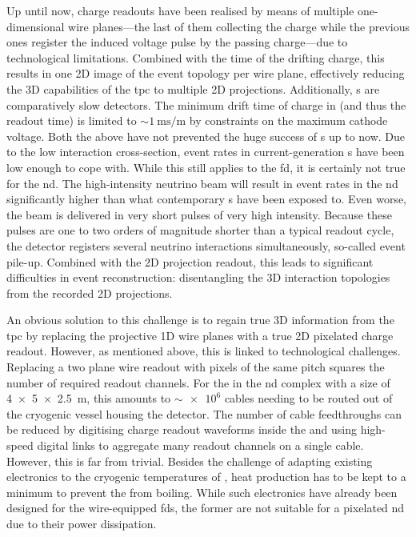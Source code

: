 Up until now, \lartpc{} charge readouts have been realised by means of multiple one-dimensional wire planes---the last of them collecting the charge while the previous ones register the induced voltage pulse by the passing charge---due to technological limitations.
Combined with the time of the drifting charge, this results in one 2D image of the event topology per wire plane, effectively reducing the 3D capabilities of the \gls{tpc} to multiple 2D projections.
Additionally, \lartpc{}s are comparatively slow detectors.
The minimum drift time of charge in \lar{} (and thus the readout time) is limited to $\sim{\SI{1}{\milli\second\per\metre}}$ by constraints on the maximum cathode voltage.
Both the above have not prevented the huge success of \lartpc{}s up to now.
Due to the low interaction cross-section, event rates in current-generation \lartpc{}s have been low enough to cope with.
While this still applies to the \dune{} \gls{fd}, it is certainly not true for the \gls{nd}.
The high-intensity neutrino beam will result in event rates in the \gls{nd} significantly higher than what contemporary \lartpc{}s have been exposed to.
Even worse, the beam is delivered in very short pulses of very high intensity.
Because these pulses are one to two orders of magnitude shorter than a typical \lartpc{} readout cycle, the detector registers several neutrino interactions simultaneously, so-called event pile-up.
Combined with the 2D projection readout, this leads to significant difficulties in event reconstruction: disentangling the 3D interaction topologies from the recorded 2D projections.

An obvious solution to this challenge is to regain true 3D information from the \gls{tpc} by replacing the projective 1D wire planes with a true 2D pixelated charge readout.
However, as mentioned above, this is linked to technological challenges.
Replacing a two plane wire readout with pixels of the same pitch squares the number of required readout channels.
For the \lartpc{} in the \dune{} \gls{nd} complex with a size of \SI{4 x 5 x 2.5}{\metre}, this amounts to $\sim{\num{e6}}$ cables needing to be routed out of the cryogenic vessel housing the detector.
The number of cable feedthroughs can be reduced by digitising charge readout waveforms inside the \lar{} and using high-speed digital links to aggregate many readout channels on a single cable.
However, this is far from trivial.
Besides the challenge of adapting existing electronics to the cryogenic temperatures of \lar{}, heat production has to be kept to a minimum to prevent the \lar{} from boiling.
While such electronics have already been designed for the wire-equipped \glspl{fd}, the former are not suitable for a pixelated \gls{nd} due to their power dissipation.

